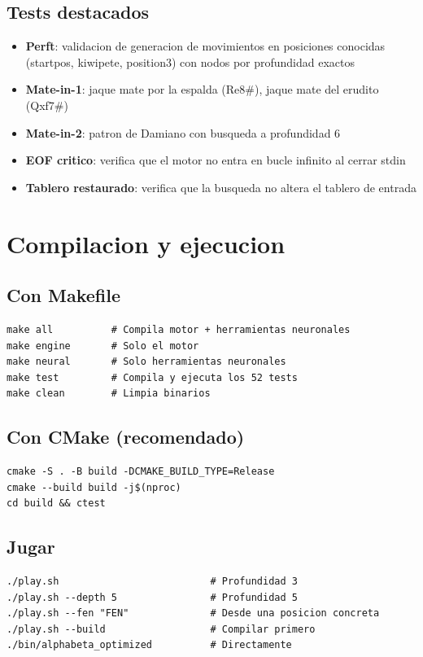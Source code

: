 \documentclass[11pt,a4paper]{article}
\begin{document}
\subsection*{Tests destacados}
\begin{itemize}
  \item \textbf{Perft}: validacion de generacion de movimientos en posiciones conocidas
        (startpos, kiwipete, position3) con nodos por profundidad exactos
  \item \textbf{Mate-in-1}: jaque mate por la espalda (Re8\#), jaque mate del erudito (Qxf7\#)
  \item \textbf{Mate-in-2}: patron de Damiano con busqueda a profundidad 6
  \item \textbf{EOF critico}: verifica que el motor no entra en bucle infinito al cerrar stdin
  \item \textbf{Tablero restaurado}: verifica que la busqueda no altera el tablero de entrada
\end{itemize}

\section{Compilacion y ejecucion}

\subsection*{Con Makefile}
\begin{verbatim}
make all          # Compila motor + herramientas neuronales
make engine       # Solo el motor
make neural       # Solo herramientas neuronales
make test         # Compila y ejecuta los 52 tests
make clean        # Limpia binarios
\end{verbatim}

\subsection*{Con CMake (recomendado)}
\begin{verbatim}
cmake -S . -B build -DCMAKE_BUILD_TYPE=Release
cmake --build build -j$(nproc)
cd build && ctest
\end{verbatim}

\subsection*{Jugar}
\begin{verbatim}
./play.sh                          # Profundidad 3
./play.sh --depth 5                # Profundidad 5
./play.sh --fen "FEN"              # Desde una posicion concreta
./play.sh --build                  # Compilar primero
./bin/alphabeta_optimized          # Directamente
\end{verbatim}
\end{document}
